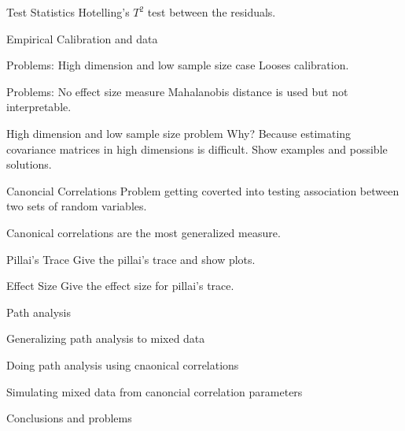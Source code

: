\documentclass{beamer}
\begin{document}
\begin{frame}{Test Statistics}
	Hotelling's $T^2$ test between the residuals.
\end{frame}

\begin{frame}{Empirical Calibration and data}
\end{frame}

\begin{frame}{Problems: High dimension and low sample size case}
	Looses calibration.
\end{frame}

\begin{frame}{Problems: No effect size measure}
	Mahalanobis distance is used but not interpretable.
\end{frame}

\begin{frame}{High dimension and low sample size problem}
	Why?
	Because estimating covariance matrices in high dimensions is difficult.
	Show examples and possible solutions.
\end{frame}

\begin{frame}{Canoncial Correlations}
	Problem getting coverted into testing association between two 
	sets of random variables.

	Canonical correlations are the most generalized measure.
\end{frame}

\begin{frame}{Pillai's Trace}
	Give the pillai's trace and show plots.
\end{frame}

\begin{frame}{Effect Size}
	Give the effect size for pillai's trace.
\end{frame}

\begin{frame}{Path analysis}
\end{frame}

\begin{frame}{Generalizing path analysis to mixed data}
\end{frame}

\begin{frame}{Doing path analysis using cnaonical correlations}
\end{frame}

\begin{frame}{Simulating mixed data from canoncial correlation parameters}
\end{frame}

\begin{frame}{Conclusions and problems}
\end{frame}
\end{document}
